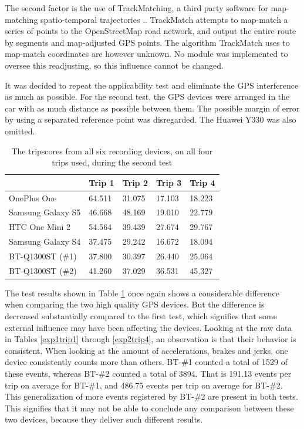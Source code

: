 The second factor is the use of TrackMatching, a third party software for map-matching spatio-temporal trajectories \citep{trackmatch}.. TrackMatch attempts to map-match a series of points to the OpenStreetMap road network, and output the entire route by segments and map-adjusted GPS points. The algorithm TrackMatch uses to map-match coordinates are however unknown. No module was implemented to oversee this readjusting, so this influence cannot be changed.

It was decided to repeat the applicability test and eliminate the GPS interference as much as possible. For the second test, the GPS devices were arranged in the car with as much distance as possible between them. The possible margin of error by using a separated reference point was disregarded. The Huawei Y330 was also omitted. 

\begin{table}[tb]
\centering
\caption{The tripscores from all six recording devices, on all four trips used, during the second test}
\label{tab:smartphone_test_two}
\begin{tabular}{|l|llll|}
\hline
\rowcolor{tablegreen}

                   & \textbf{Trip 1}    & \textbf{Trip 2}    & \textbf{Trip 3}    & \textbf{Trip 4}  \\\hline
OnePlus One        & 64.511  & 31.075  & 17.103  & 18.223 \\
Samsung Galaxy S5  & 46.668  & 48.169  & 19.010  & 22.779 \\
HTC One Mini 2     & 54.564  & 39.439  & 27.674  & 29.767 \\
Samsung Galaxy S4  & 37.475  & 29.242  & 16.672  & 18.094 \\
BT-Q1300ST (\#1)   & 37.800  & 30.397  & 26.440  & 25.064 \\
BT-Q1300ST (\#2)   & 41.260  & 37.029  & 36.531  & 45.327 \\\hline

\end{tabular}
\end{table}

The test results shown in Table \ref{tab:smartphone_test_two} once again shows a considerable difference when comparing the two high quality GPS devices. But the difference is decreased substantially compared to the first test, which signifies that some external influence may have been affecting the devices. Looking at the raw data in Tables \ref{exp1trip1} through \ref{exp2trip4}, an observation is that their behavior is consistent. When looking at the amount of accelerations, brakes and jerks, one device consistently counts more than others. BT-\#1 counted a total of 1529 of these events, whereas BT-\#2 counted a total of 3894. That is 191.13 events per trip on average for BT-\#1, and 486.75 events per trip on average for BT-\#2. This generalization of more events registered by BT-\#2 are present in both tests. This signifies that it may not be able to conclude any comparison between these two devices, because they deliver such different results.

